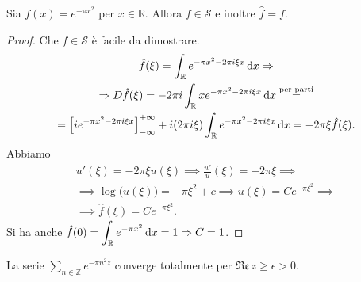 \begin{lm}
  Sia $f(x)=e^{-\pi x^2}$ per $x \in \mathbb{R}$. Allora $f \in \mathcal{S}$ e inoltre $\hat{f}=f$.
\end{lm}

\begin{proof}
  Che $f \in \mathcal{S}$ è facile da dimostrare.
  \begin{gather*}
    \hat{f}(\xi)=\int_{\mathbb{R}} e^{-\pi x^2-2\pi i\xi x}\mathop{}\!\mathrm{d} x \Rightarrow \\
    \Rightarrow D\hat{f}(\xi)=-2\pi i\int_{\mathbb{R}} xe^{-\pi x^2-2\pi i\xi x}\mathop{}\!\mathrm{d} x \overset{\text{per parti}}{=} \\
    =\left[ie^{-\pi x^2-2\pi i\xi x}\right]_{-\infty}^{+\infty}+i(2\pi i\xi)\int_{\mathbb{R}} e^{-\pi x^2-2\pi i\xi x}\mathop{}\!\mathrm{d} x=-2\pi \xi \hat{f}(\xi).
  \end{gather*}
  Abbiamo
  \begin{gather*}
    u'(\xi)=-2\pi\xi u(\xi) \implies \frac{u'}{u}(\xi)=-2\pi\xi \implies \\
    \implies \log\big(u(\xi)\big)=-\pi\xi^2+c \implies u(\xi)=Ce^{-\pi\xi^2} \implies \\
    \implies \hat{f}(\xi)=Ce^{-\pi\xi^2}.
  \end{gather*}
  Si ha anche $\displaystyle \hat{f}(0)=\int_{\mathbb{R}} e^{-\pi x^2}\mathop{}\!\mathrm{d} x=1 \Rightarrow C=1$.
\end{proof}

\begin{oss}
  La serie $\displaystyle \sum_{n \in \mathbb{Z}} e^{-\pi n^2 z}$ converge totalmente per $\mathfrak{Re}\,z \ge \epsilon>0$.
\end{oss}
